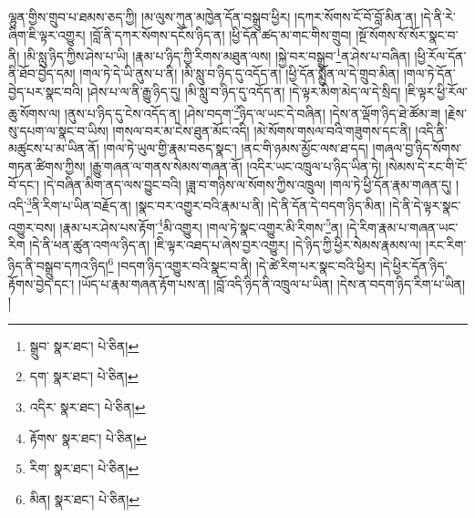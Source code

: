 ལྷུན་གྱིས་གྲུབ་པ་ཐམས་ཅད་ཀྱི། །མ་ལུས་ཀུན་མཁྱེན་དོན་བསྒྲུབ་ཕྱིར། །དཀར་སོགས་ངོ་བོ་བློ་མིན་ན། །དེ་ནི་རེ་ཞིག་ཇི་ལྟར་འགྱུར། །བློ་ནི་དཀར་སོགས་དངོས་ཉིད་ན། །ཕྱི་དོན་ཚད་མ་གང་གིས་གྲུབ། །སྔོ་སོགས་སོ་སོར་སྣང་བ་ནི། །མི་སླུ་ཉིད་ཀྱིས་ཤེས་པ་ཡི། །རྣམ་པ་ཉིད་ཀྱི་རིགས་མཐུན་ལས། །སྐྱེ་བར་བསྒྲུབ་\footnote{སྒྲུབ་  སྣར་ཐང་།  པེ་ཅིན། }ན་ཤེས་པ་བཞིན། །ཕྱི་རོལ་དོན་ནི་ཐོབ་བྱེད་དམ། །གལ་ཏེ་དེ་ཡི་ནུས་པ་ནི། །མི་སླུ་བ་ཉིད་དུ་འདོད་ན། །ཕྱི་དོན་སྨྱོན་ལ་དེ་གྲུབ་མིན། །གལ་ཏེ་དོན་བྱེད་པར་སྣང་བའི། །ཤེས་པ་ལ་ནི་རྒྱུ་ཉིད་དུ། །མི་སླུ་བ་ཉིད་དུ་འདོད་ན། །དེ་ལྟར་མིག་མེད་ལ་དེ་སྲིད། །ཇི་ལྟར་ཕྱི་རོལ་ཆུ་སོགས་ལ། །ནུས་པ་ཉིད་དུ་ངེས་འདོད་ན། །ཤེས་བདག་\footnote{དག་  སྣར་ཐང་།  པེ་ཅིན། }ཉིད་ལ་ཡང་དེ་བཞིན། །དེས་ན་ལྡོག་ཉིད་ཐེ་ཚོམ་ཟ། །རྗེས་སུ་དཔག་ལ་སྣང་བ་ཡིས། །གསལ་བར་མ་ངེས་ཐུན་མོང་འདི། །མེ་སོགས་གསལ་བའི་གཟུགས་དང་ནི། །འདི་ནི་མཚུངས་པ་མ་ཡིན་ནོ། །གལ་ཏེ་ཡུལ་གྱི་རྣམ་བཅད་སྣང་། །ནང་གི་ཉམས་མྱོང་ལས་ཐ་དད། །གཞལ་བྱ་ཉིད་སོགས་གཏན་ཚིགས་ཀྱིས། །རྒྱུ་གཞན་ལ་གནས་སེམས་གཞན་ནོ། །འདིར་ཡང་འཁྲུལ་པ་ཉིད་ཡིན་ཏེ། །སེམས་དེ་རང་གི་ངོ་བོ་དང་། །དེ་བཞིན་མིག་ནད་ལས་བྱུང་བའི། །ཟླ་བ་གཉིས་ལ་སོགས་ཀྱིས་འཁྲུལ། །གལ་ཏེ་ཕྱི་དོན་རྣམ་གཞན་དུ། །འདི་\footnote{འདིར་  སྣར་ཐང་།  པེ་ཅིན། }ནི་རིག་པ་ཡིན་བརྗོད་ན། །སྣང་བར་འགྱུར་བའི་རྣམ་པ་ནི། །དེ་ནི་དོན་དེ་བདག་ཉིད་མིན། །དེ་ནི་དེ་ལྟར་སྣང་འགྱུར་བས། །རྣམ་པར་ཤེས་པས་རྟོག་\footnote{རྟོགས་  སྣར་ཐང་།  པེ་ཅིན། }མི་འགྱུར། །གལ་ཏེ་སྣང་འགྱུར་མི་རིགས་\footnote{རིག་  སྣར་ཐང་།  པེ་ཅིན། }ན། །དེ་རིག་རྣམ་པ་གཞན་ཡང་རིག །དེ་ནི་ཕན་ཚུན་འགལ་ཉིད་ན། །ཇི་ལྟར་འཐད་པ་ཞེས་བྱར་འགྱུར། །དེ་ཉིད་ཀྱི་ཕྱིར་སེམས་རྣམས་ལ། །རང་རིག་ཉིད་ནི་བསྒྲུབ་དཀའ་ཉིད།\footnote{མིན།  སྣར་ཐང་།  པེ་ཅིན། } །བདག་ཉིད་འགྱུར་བའི་སྣང་བ་ནི། །དེ་ཚེ་རིག་པར་སྣང་བའི་ཕྱིར། །དེ་ཕྱིར་དོན་ཉིད་རྟོགས་བྱེད་དང་། །ཡོད་པ་རྣམ་གཞན་རྟོག་པས་ན། །བློ་འདི་ཉིད་ནི་འཁྲུལ་པ་ཡིན། །དེས་ན་བདག་ཉིད་རིག་པ་ཡིན། །
